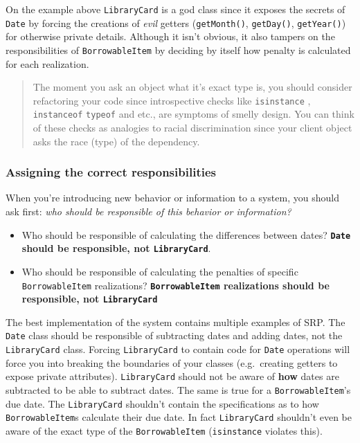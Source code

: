 On the example above \texttt{LibraryCard} is a god class since it
exposes the secrets of \texttt{Date} by forcing the creations of
\emph{evil} getters (\texttt{getMonth()}, \texttt{getDay()},
\texttt{getYear()}) for otherwise private details. Although it isn't
obvious, it also tampers on the responsibilities of
\texttt{BorrowableItem} by deciding by itself how penalty is calculated
for each realization.

\begin{quote}
The moment you ask an object what it's exact type is, you should
consider refactoring your code since introspective checks like
\texttt{isinstance} , \texttt{instanceof} \texttt{typeof} and etc., are
symptoms of smelly design. You can think of these checks as analogies to
racial discrimination since your client object asks the race (type) of
the dependency.
\end{quote}

\subsubsection{Assigning the correct
responsibilities}\label{solid-objects.md__assigning-the-correct-responsibilities}

When you're introducing new behavior or information to a system, you
should ask first: \emph{who should be responsible of this behavior or
information?}

\begin{itemize}
\tightlist
\item
  Who should be responsible of calculating the differences between
  dates? \textbf{\texttt{Date} should be responsible, not
  \texttt{LibraryCard}}.
\item
  Who should be responsible of calculating the penalties of specific
  \texttt{BorrowableItem} realizations? \textbf{\texttt{BorrowableItem}
  realizations should be responsible, not \texttt{LibraryCard}}
\end{itemize}

The best implementation of the system contains multiple examples of SRP.
The \texttt{Date} class should be responsible of subtracting dates and
adding dates, not the \texttt{LibraryCard} class. Forcing
\texttt{LibraryCard} to contain code for \texttt{Date} operations will
force you into breaking the boundaries of your classes (e.g.~creating
getters to expose private attributes). \texttt{LibraryCard} should not
be aware of \textbf{how} dates are subtracted to be able to subtract
dates. The same is true for a \texttt{BorrowableItem}'s due date. The
\texttt{LibraryCard} shouldn't contain the specifications as to how
\texttt{BorrowableItem}s calculate their due date. In fact
\texttt{LibraryCard} shouldn't even be aware of the exact type of the
\texttt{BorrowableItem} (\texttt{isinstance} violates this).


